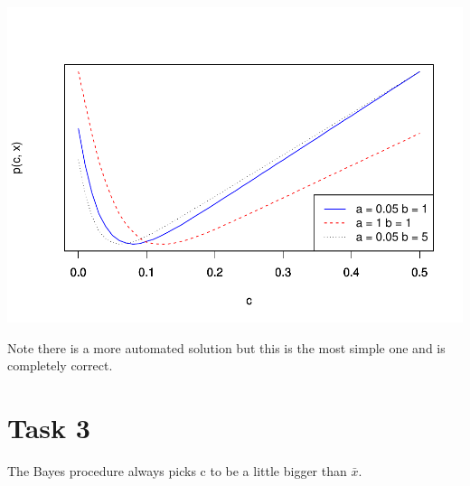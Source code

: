 \documentclass[
]{article}
\begin{document}
\includegraphics{lab-03_files/figure-latex/unnamed-chunk-5-1.pdf}

Note there is a more automated solution but this is the most simple one
and is completely correct.

\hypertarget{task-3}{%
\section{Task 3}\label{task-3}}

The Bayes procedure always picks c to be a little bigger than
\(\bar{x}\).
\end{document}
